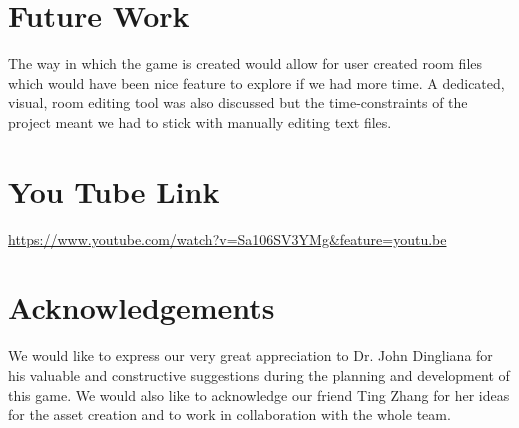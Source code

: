 \documentclass[11pt]{article}
\begin{document}
\section{Future Work}

The way in which the game is created would allow for user created room files which would have been nice feature to explore if we had more time. A dedicated, visual, room editing tool was also discussed but the time-constraints of the project meant we had to stick with manually editing text files. 

\section{You Tube Link}
\url{https://www.youtube.com/watch?v=Sa106SV3YMg&feature=youtu.be}

\section{Acknowledgements}
We would like to express our very great appreciation to Dr. John Dingliana for his valuable and constructive suggestions during the planning and development of this game. We would also like to acknowledge our friend Ting Zhang for her ideas for the asset creation and to work in collaboration with the whole team.  
\end{document}

